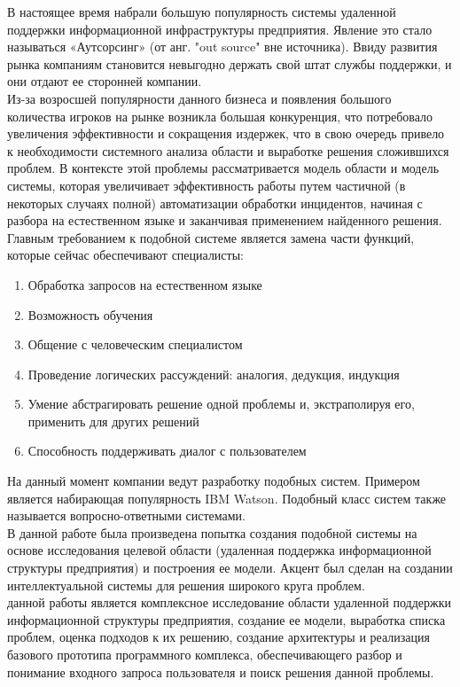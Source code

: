 {\actuality}
В настоящее время набрали большую популярность системы удаленной поддержки информационной инфраструктуры предприятия. Явление это стало называться «Аутсорсинг» (от анг. "out source" \- вне источника). Ввиду развития рынка компаниям становится невыгодно держать свой штат службы поддержки, и они отдают ее сторонней компании. \\
Из-за возросшей популярности данного бизнеса и появления большого количества игроков на рынке возникла большая конкуренция, что потребовало увеличения эффективности и сокращения издержек, что в свою очередь привело к необходимости системного анализа области и выработке решения сложившихся проблем. В контексте этой проблемы рассматривается модель области и модель системы, которая увеличивает эффективность работы путем частичной (в некоторых случаях полной) автоматизации обработки инцидентов, начиная с разбора на естественном языке и заканчивая применением найденного решения. \\
Главным требованием к подобной системе является замена части функций, которые сейчас обеспечивают специалисты:
\begin{enumerate}
  \item Обработка запросов на естественном языке
  \item Возможность обучения
  \item Общение с человеческим специалистом
  \item Проведение логических рассуждений: аналогия, дедукция, индукция
  \item Умение абстрагировать решение одной проблемы и, экстраполируя его, применить для других решений
  \item Способность поддерживать диалог с пользователем
\end{enumerate}

На данный момент компании ведут разработку подобных систем. Примером является набирающая популярность IBM Watson. Подобный класс систем также называется вопросно-ответными системами. \\
В данной работе была произведена попытка создания подобной системы на основе исследования целевой области (удаленная поддержка информационной структуры предприятия) и построения ее модели.
 Акцент был сделан на создании интеллектуальной системы для решения широкого круга проблем. \\
 
{\aim} данной работы является комплексное исследование области удаленной поддержки информационной структуры предприятия, создание ее модели, выработка списка проблем, оценка подходов к их решению,  создание архитектуры и реализация базового прототипа программного комплекса, обеспечивающего разбор и понимание входного запроса пользователя и поиск решения данной проблемы.

